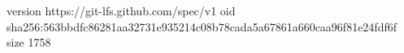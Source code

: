 version https://git-lfs.github.com/spec/v1
oid sha256:563bbdfc86281aa32731e935214c08b78cada5a67861a660caa96f81e24fdf6f
size 1758
